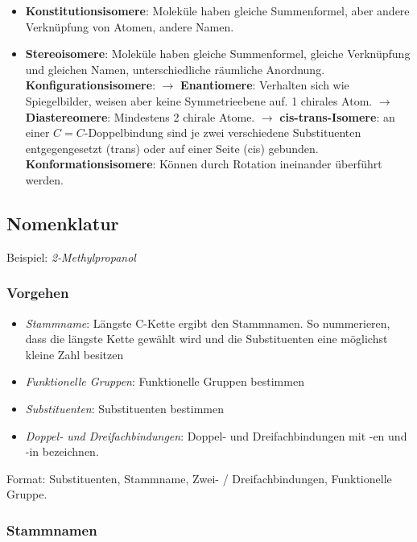 \begin{itemize}
	\item \textbf{Konstitutionsisomere}: Moleküle haben gleiche Summenformel, aber andere Verknüpfung von Atomen, andere Namen.
	\item \textbf{Stereoisomere}: Moleküle haben gleiche Summenformel, gleiche Verknüpfung und gleichen Namen, unterschiedliche räumliche Anordnung.
		\subitem \textbf{Konfigurationsisomere}: 
		\subitem $\rightarrow$ \textbf{Enantiomere}: Verhalten sich wie Spiegelbilder, weisen aber keine Symmetrieebene auf. 1 chirales Atom.
		\subitem $\rightarrow$ \textbf{Diastereomere}: Mindestens 2 chirale Atome.
		\subitem $\rightarrow$ \textbf{cis-trans-Isomere}: an einer $C=C$-Doppelbindung sind je zwei verschiedene Substituenten entgegengesetzt (trans) oder auf einer Seite (cis) gebunden.
		\subitem \textbf{Konformationsisomere}: Können durch Rotation ineinander überführt werden.
\end{itemize}

\subsection{Nomenklatur}

Beispiel: \textit{2-Methylpropanol}

\subsubsection{Vorgehen}

\begin{itemize}
	\item \textit{Stammname}: Längste C-Kette ergibt den Stammnamen. So nummerieren, dass die längste Kette gewählt wird und die Substituenten eine möglichst kleine Zahl besitzen
	\item \textit{Funktionelle Gruppen}: Funktionelle Gruppen bestimmen
	\item \textit{Substituenten}: Substituenten bestimmen
	\item \textit{Doppel- und Dreifachbindungen}: Doppel- und Dreifachbindungen mit -en und -in bezeichnen.
\end{itemize}

Format: Substituenten, Stammname, Zwei- / Dreifachbindungen, Funktionelle Gruppe.
\subsubsection{Stammnamen}

